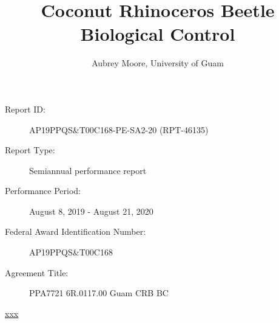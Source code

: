 \documentclass[12pt,
letterpaper,english,bibliography=totocnumbered, abstract=on]{scrartcl}
\begin{document}
\titlehead{USDA-APHIS Progress Report}
\title{Coconut Rhinoceros Beetle Biological Control}
\author{Aubrey Moore, University of Guam}
\maketitle
\begin{description}	
	\item[Report ID:] AP19PPQS\&T00C168-PE-SA2-20 (RPT-46135)
	\item[Report Type:] Semiannual performance report
	\item[Performance Period:] August 8, 2019 - August 21, 2020
	\item[Federal Award Identification Number:] AP19PPQS\&T00C168
	\item[Agreement Title:] PPA7721 6R.0117.00 Guam CRB BC
\end{description}

\begin{footnotesize}
\url{xxx}
\end{footnotesize}

\newpage{}
\end{document}
